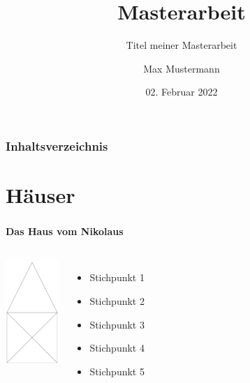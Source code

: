\documentclass{beamer}
\title{Masterarbeit}
\subtitle{Titel meiner Masterarbeit}
\author{Max Mustermann}
\date{02. Februar 2022}
\begin{document}
\begin{frame}
	\titlepage
\end{frame}

\begin{frame}
	\frametitle{Inhaltsverzeichnis}
	\tableofcontents
\end{frame}

\section{Häuser}
\begin{frame}
\frametitle{\insertsection}
\framesubtitle{Das Haus vom Nikolaus}
\begin{columns}
	\centering
	\includegraphics[width=2cm]{house.png}
	\begin{itemize}
		\item<1-> Stichpunkt 1
		\item<2-> Stichpunkt 2
		\item<3-> Stichpunkt 3
		\item<4-> Stichpunkt 4
		\item<5-> Stichpunkt 5
	\end{itemize}
\end{columns}
\end{frame}
\end{document}
